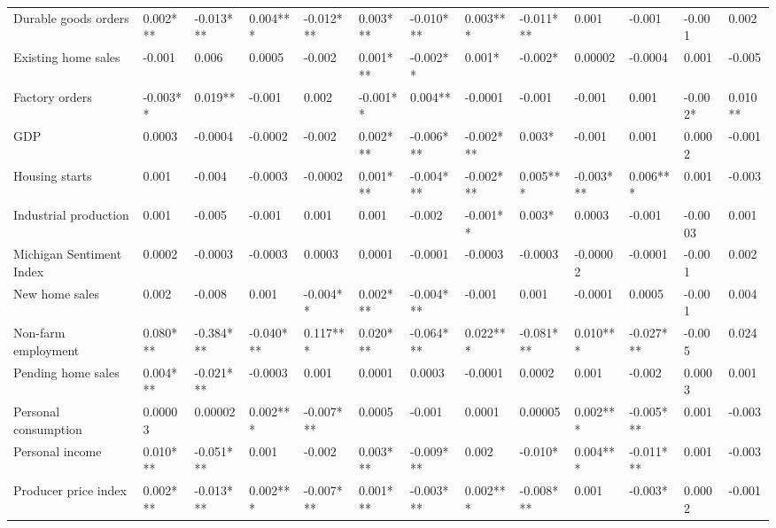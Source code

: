 \begin{landscape}
\begin{table}[]
{\begin{tabular}{lllllllllllll}
Durable goods orders     & 0.002***  & -0.013*** & 0.004***  & -0.012*** & 0.003*** & -0.010*** & 0.003***  & -0.011*** & 0.001     & -0.001    & -0.001   & 0.002   \\
Existing home sales      & -0.001    & 0.006     & 0.0005    & -0.002    & 0.001*** & -0.002**  & 0.001*    & -0.002*   & 0.00002   & -0.0004   & 0.001    & -0.005  \\
Factory orders           & -0.003**  & 0.019**   & -0.001    & 0.002     & -0.001** & 0.004**   & -0.0001   & -0.001    & -0.001    & 0.001     & -0.002*  & 0.010** \\
GDP                      & 0.0003    & -0.0004   & -0.0002   & -0.002    & 0.002*** & -0.006*** & -0.002*** & 0.003*    & -0.001    & 0.001     & 0.0002   & -0.001  \\
Housing starts           & 0.001     & -0.004    & -0.0003   & -0.0002   & 0.001*** & -0.004*** & -0.002*** & 0.005***  & -0.003*** & 0.006***  & 0.001    & -0.003  \\
Industrial production    & 0.001     & -0.005    & -0.001    & 0.001     & 0.001    & -0.002    & -0.001**  & 0.003*    & 0.0003    & -0.001    & -0.0003  & 0.001   \\
Michigan Sentiment Index & 0.0002    & -0.0003   & -0.0003   & 0.0003    & 0.0001   & -0.0001   & -0.0003   & -0.0003   & -0.00002  & -0.0001   & -0.001   & 0.002   \\
New home sales           & 0.002     & -0.008    & 0.001     & -0.004**  & 0.002*** & -0.004*** & -0.001    & 0.001     & -0.0001   & 0.0005    & -0.001   & 0.004   \\
Non-farm employment      & 0.080***  & -0.384*** & -0.040*** & 0.117***  & 0.020*** & -0.064*** & 0.022***  & -0.081*** & 0.010***  & -0.027*** & -0.005   & 0.024   \\
Pending home sales       & 0.004***  & -0.021*** & -0.0003   & 0.001     & 0.0001   & 0.0003    & -0.0001   & 0.0002    & 0.001     & -0.002    & 0.0003   & 0.001   \\
Personal consumption     & 0.00003   & 0.00002   & 0.002***  & -0.007*** & 0.0005   & -0.001    & 0.0001    & 0.00005   & 0.002***  & -0.005*** & 0.001    & -0.003  \\
Personal income          & 0.010***  & -0.051*** & 0.001     & -0.002    & 0.003*** & -0.009*** & 0.002     & -0.010*   & 0.004***  & -0.011*** & 0.001    & -0.003  \\
Producer price index     & 0.002***  & -0.013*** & 0.002***  & -0.007*** & 0.001*** & -0.003*** & 0.002***  & -0.008*** & 0.001     & -0.003*   & 0.0002   & -0.001  \\

\end{tabular}}
\end{table}
\end{landscape}
